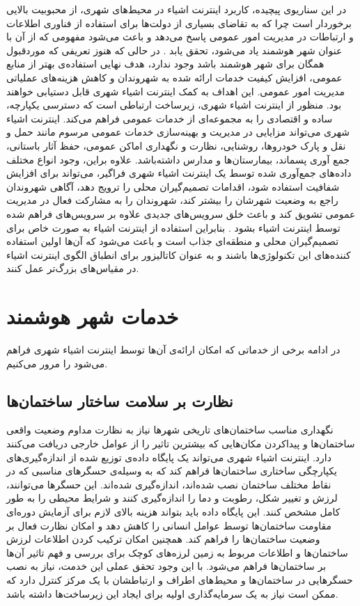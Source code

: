     در این سناریوی پیچیده، کاربرد اینترنت اشیاء در محیط‌های شهری، از محبوبیت بالایی برخوردار است چرا که به تقاضای بسیاری از دولت‌ها برای استفاده از فناوری‌ اطلاعات و ارتباطات در مدیریت امور عمومی پاسخ می‌دهد و باعث می‌شود مفهومی که از آن با عنوان شهر هوشمند یاد می‌شود، تحقق یابد \cite{schaffers2011smart}.
    در حالی که هنوز تعریفی که موردقبول همگان برای شهر هوشمند باشد وجود ندارد، هدف نهایی استفاده‌ی بهتر از منابع عمومی، افزایش کیفیت خدمات ارائه شده به شهروندان و کاهش هزینه‌های عملیاتی مدیریت امور عمومی.
    این اهداف به کمک اینترنت اشیاء شهری قابل دستیابی خواهند بود.
    منظور از اینترنت اشیاء شهری، زیرساخت ارتباطی است که دسترسی یکپارچه، ساده و اقتصادی را به مجموعه‌ای از خدمات عمومی فراهم می‌کند.
    اینترنت اشیاء شهری می‌تواند مزایایی در مدیریت و بهینه‌سازی خدمات عمومی مرسوم مانند حمل و نقل و پارک خودرو‌ها، روشنایی، نظارت و نگهداری اماکن عمومی، حفظ آثار باستانی، جمع آوری پسماند، بیمارستان‌ها و مدارس داشته‌باشد.
    علاوه براین، وجود انواع مختلف داده‌های جمع‌آوری شده توسط یک اینترنت اشیاء شهری فراگیر، می‌تواند برای افزایش شفافیت استفاده شود، اقدامات تصمیم‌گیران محلی را ترویج دهد، آگاهی شهروندان راجع به وضعیت شهرشان را بیشتر کند، شهروندان را به مشارکت فعال در مدیریت عمومی تشویق کند و باعث خلق سرویس‌های جدیدی علاوه بر سرویس‌های فراهم شده توسط اینترنت اشیاء بشود \cite{cuff2008urban}.
    بنابراین استفاده از اینترنت اشیاء به صورت خاص برای تصمیم‌گیران محلی و منطقه‌ای جذاب است و باعث می‌شود که آن‌ها اولین استفاده کننده‌های این تکنولوژی‌ها باشند و به عنوان کاتالیزور برای انطباق الگوی اینترنت اشیاء در مقیاس‌های بزرگ‌تر عمل کنند.

  \section{خدمات شهر هوشمند}
    در ادامه برخی از خدماتی که امکان ارائه‌ی آن‌ها توسط اینترنت اشیاء شهری فراهم می‌شود را مرور می‌کنیم.
    \subsection{نظارت بر سلامت ساختار ساختمان‌ها}
      نگهداری مناسب ساختمان‌های تاریخی شهر‌ها نیاز به نظارت مداوم وضعیت واقعی ساختمان‌ها و پیدا‌کردن‌ مکان‌هایی که بیشترین تاثیر را از عوامل خارجی دریافت می‌کنند دارد.
      اینترنت اشیاء شهری می‌تواند یک پایگاه داده‌ی توزیع شده از اندازه‌گیری‌های یکپارچگی ساختاری ساختمان‌ها فراهم ‌کند که به وسیله‌ی حسگر‌های مناسبی که در نقاط مختلف ساختمان نصب شده‌اند، اندازه‌گیری شده‌اند.
      این حسگر‌ها می‌توانند، لرزش و تغییر شکل، رطوبت و دما را اندازه‌گیری کنند و شرایط محیطی را به طور کامل مشخص کنند\cite{lynch2006summary}.
      این پایگاه داده باید بتواند هزینه بالای لازم برای آزمایش دوره‌ای مقاومت ساختمان‌ها توسط عوامل انسانی را کاهش دهد و امکان نظارت فعال بر وضعیت ساختمان‌ها را فراهم کند.
      همچنین امکان ترکیب کردن اطلاعات لرزش ساختمان‌ها و اطلاعات مربوط به زمین لرزه‌های کوچک برای بررسی و فهم تاثیر آن‌ها بر ساختمان‌ها فراهم می‌شود.
      با این وجود تحقق عملی این خدمت، نیاز به نصب حسگر‌هایی در ساختمان‌ها و محیط‌های اطراف و ارتباطشان با یک مرکز کنترل دارد که ممکن است نیاز به یک سرمایه‌گذاری اولیه برای ایجاد این زیرساخت‌ها داشته باشد.

